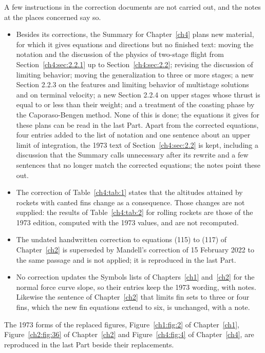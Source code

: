 A few instructions in the correction documents are not carried out, and the notes at the places
concerned say so.
\begin{itemize}
  \item Besides its corrections, the Summary for Chapter~\ref{ch4} plans new material, for which it
    gives equations and directions but no finished text: moving the notation and the discussion of
    the physics of two-stage flight from Section~\ref{ch4:sec:2.2.1} up to
    Section~\ref{ch4:sec:2.2}; revising the discussion of limiting behavior; moving the
    generalization to three or more stages; a new Section 2.2.3 on the features and limiting
    behavior of multistage solutions and on terminal velocity; a new Section 2.2.4 on upper stages
    whose thrust is equal to or less than their weight; and a treatment of the coasting phase by
    the Caporaso-Bengen method. None of this is done; the equations it gives for these plans can
    be read in the last Part. Apart from the corrected equations, four entries added to the list of
    notation and one sentence about an upper limit of integration, the 1973 text of
    Section~\ref{ch4:sec:2.2} is kept, including a discussion that the Summary calls unnecessary
    after its rewrite and a few sentences that no longer match the corrected equations; the notes
    point these out.
  \item The correction of Table~\ref{ch4:tab:1} states that the altitudes attained by rockets with
    canted fins change as a consequence. Those changes are not supplied: the results of
    Table~\ref{ch4:tab:2} for rolling rockets are those of the 1973 edition, computed with the 1973
    values, and are not recomputed.
  \item The undated handwritten correction to equations (115) to (117) of Chapter~\ref{ch2} is
    superseded by Mandell's correction of 15 February 2022 to the same passage and is not applied;
    it is reproduced in the last Part.
  \item No correction updates the Symbols lists of Chapters~\ref{ch1} and~\ref{ch2} for the normal
    force curve slope, so their entries keep the 1973 wording, with notes. Likewise the sentence of
    Chapter~\ref{ch2} that limits fin sets to three or four fins, which the new fin equations
    extend to six, is unchanged, with a note.
\end{itemize}
The 1973 forms of the replaced figures, Figure~\ref{ch1:fig:2} of Chapter~\ref{ch1},
Figure~\ref{ch2:fig:36} of Chapter~\ref{ch2} and Figure~\ref{ch4:fig:4} of Chapter~\ref{ch4}, are
reproduced in the last Part beside their replacements.

